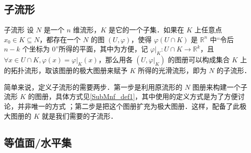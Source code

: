 

\begin{issues}
\issueDraft
\end{issues}


\subsection{子流形}

\begin{definition}{子流形}\label{SubMnf_def1}
设 $N$ 是一个 $n$ 维流形，$K$ 是它的一个子集．如果在 $K$ 上任意点 $x_0\in K\subseteq N$，都存在一个 $N$ 的图 $(U, \varphi)$，使得 $\varphi (U\cap K)$ 是 $\mathbb{R}^n$ 中“令后 $n-k$ 个坐标为 $0$”所得的平面，其中为方便，记 $\varphi|_K:U\cap K\rightarrow\mathbb{R}^k$，且 $\forall x\in U\cap K, \varphi(x)=\varphi|_K(x)$，那么用各 $(U, \varphi|_K)$ 的图册可以构成集合 $K$ 上的拓扑流形，取该图册的极大图册来赋予 $K$ 所得的光滑流形，即为 $N$ 的子流形．
\end{definition}

简单来说，定义子流形的需要两步．第一步是利用原流形的 $N$ 图册来构建一个子流形 $K$ 的图册，具体方式见\autoref{SubMnf_def1}，其中使用的定义方式是为了方便讨论，并非唯一的方式 ；第二步是把这个图册扩充为极大图册．这样，配备了此极大图册的 $K$ 就是我们需要的子流形．


\subsection{等值面/水平集}%
